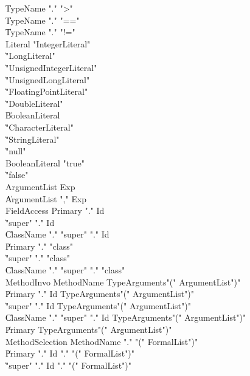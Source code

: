 {\begin{grammar}
    \| TypeName \xcd"." \xcd">"\\
    \| TypeName \xcd"." \xcd"=="\\
    \| TypeName \xcd"." \xcd"!="\\
 Literal  \: \xcd"IntegerLiteral" \\
    \| \xcd"LongLiteral" \\
    \| \xcd"UnsignedIntegerLiteral" \\
    \| \xcd"UnsignedLongLiteral" \\
    \| \xcd"FloatingPointLiteral" \\
    \| \xcd"DoubleLiteral" \\
    \| BooleanLiteral\\
    \| \xcd"CharacterLiteral" \\
    \| \xcd"StringLiteral" \\
    \| \xcd"null"\\
 BooleanLiteral  \: \xcd"true" \\
    \| \xcd"false" \\
 ArgumentList  \: Exp\\
    \| ArgumentList \xcd"," Exp\\
 FieldAccess  \: Primary \xcd"." Id\\
    \| \xcd"super" \xcd"." Id\\
    \| ClassName \xcd"." \xcd"super"  \xcd"." Id\\
    \| Primary \xcd"." \xcd"class" \\
    \| \xcd"super" \xcd"." \xcd"class" \\
    \| ClassName \xcd"." \xcd"super"  \xcd"." \xcd"class" \\
 MethodInvo  \: MethodName TypeArguments\opt \xcd"(" ArgumentList\opt \xcd")"\\
    \| Primary \xcd"." Id TypeArguments\opt \xcd"(" ArgumentList\opt \xcd")"\\
    \| \xcd"super" \xcd"." Id TypeArguments\opt \xcd"(" ArgumentList\opt \xcd")"\\
    \| ClassName \xcd"." \xcd"super"  \xcd"." Id TypeArguments\opt \xcd"(" ArgumentList\opt \xcd")"\\
    \| Primary TypeArguments\opt \xcd"(" ArgumentList\opt \xcd")"\\
 MethodSelection  \: MethodName \xcd"." \xcd"(" FormalList\opt \xcd")"\\
    \| Primary \xcd"." Id \xcd"." \xcd"(" FormalList\opt \xcd")"\\
    \| \xcd"super" \xcd"." Id \xcd"." \xcd"(" FormalList\opt \xcd")"\\

\end{grammar}}
